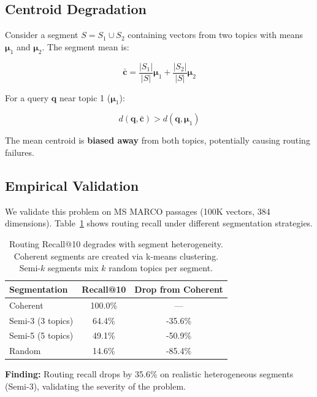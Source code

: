 \documentclass[sigconf, nonacm]{acmart}
\begin{document}
\subsection{Centroid Degradation}

Consider a segment $S = S_1 \cup S_2$ containing vectors from two topics with means $\boldsymbol{\mu}_1$ and $\boldsymbol{\mu}_2$. The segment mean is:

\begin{equation}
\bar{\mathbf{c}} = \frac{|S_1|}{|S|}\boldsymbol{\mu}_1 + \frac{|S_2|}{|S|}\boldsymbol{\mu}_2
\end{equation}

For a query $\mathbf{q}$ near topic 1 ($\boldsymbol{\mu}_1$):

\begin{equation}
d(\mathbf{q}, \bar{\mathbf{c}}) > d(\mathbf{q}, \boldsymbol{\mu}_1)
\end{equation}

The mean centroid is \textbf{biased away} from both topics, potentially causing routing failures.

\subsection{Empirical Validation}

We validate this problem on MS MARCO passages (100K vectors, 384 dimensions). Table~\ref{tab:problem} shows routing recall under different segmentation strategies.

\begin{table}[h]
\caption{Routing Recall@10 degrades with segment heterogeneity. Coherent segments are created via k-means clustering. Semi-$k$ segments mix $k$ random topics per segment.}
\label{tab:problem}
\begin{tabular}{lcc}
\toprule
\textbf{Segmentation} & \textbf{Recall@10} & \textbf{Drop from Coherent} \\
\midrule
Coherent & 100.0\% & --- \\
Semi-3 (3 topics) & 64.4\% & -35.6\% \\
Semi-5 (5 topics) & 49.1\% & -50.9\% \\
Random & 14.6\% & -85.4\% \\
\bottomrule
\end{tabular}
\end{table}

\textbf{Finding:} Routing recall drops by 35.6\% on realistic heterogeneous segments (Semi-3), validating the severity of the problem.
\end{document}
